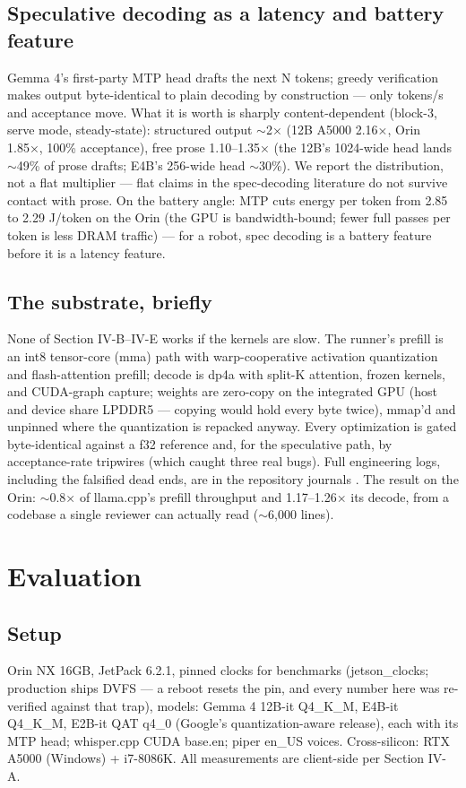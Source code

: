 \documentclass[journal]{IEEEtran}
\begin{document}
\subsection{Speculative decoding as a latency and battery feature}
Gemma 4's first-party MTP head drafts the next N tokens; greedy verification makes output byte-identical to plain decoding by construction — only tokens/s and acceptance move. What it is worth is sharply content-dependent (block-3, serve mode, steady-state): structured output $\sim$2× (12B A5000 2.16×, Orin 1.85×, 100\% acceptance), free prose 1.10–1.35× (the 12B's 1024-wide head lands $\sim$49\% of prose drafts; E4B's 256-wide head $\sim$30\%). We report the distribution, not a flat multiplier — flat claims in the spec-decoding literature do not survive contact with prose. On the battery angle: MTP cuts energy per token from 2.85 to 2.29 J/token on the Orin (the GPU is bandwidth-bound; fewer full passes per token is less DRAM traffic) — for a robot, spec decoding is a battery feature before it is a latency feature.

\subsection{The substrate, briefly}
None of Section IV-B–IV-E works if the kernels are slow. The runner's prefill is an int8 tensor-core (mma) path with warp-cooperative activation quantization and flash-attention prefill; decode is dp4a with split-K attention, frozen kernels, and CUDA-graph capture; weights are zero-copy on the integrated GPU (host and device share LPDDR5 — copying would hold every byte twice), mmap'd and unpinned where the quantization is repacked anyway. Every optimization is gated byte-identical against a f32 reference and, for the speculative path, by acceptance-rate tripwires (which caught three real bugs). Full engineering logs, including the falsified dead ends, are in the repository journals \cite{littlegemma}. The result on the Orin: $\sim$0.8× of llama.cpp's prefill throughput and 1.17–1.26× its decode, from a codebase a single reviewer can actually read ($\sim$6,000 lines).

\section{Evaluation}

\subsection{Setup}
Orin NX 16GB, JetPack 6.2.1, pinned clocks for benchmarks (jetson\_clocks; production ships DVFS — a reboot resets the pin, and every number here was re-verified against that trap), models: Gemma 4 12B-it Q4\_K\_M, E4B-it Q4\_K\_M, E2B-it QAT q4\_0 (Google's quantization-aware release), each with its MTP head; whisper.cpp CUDA base.en; piper en\_US voices. Cross-silicon: RTX A5000 (Windows) + i7-8086K. All measurements are client-side per Section IV-A.
\end{document}

